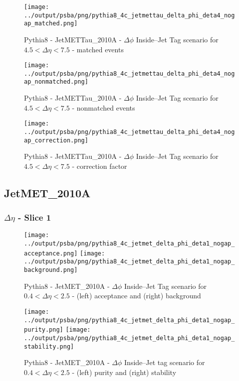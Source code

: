 \documentclass[11pt]{book}
\begin{document}
\begin{figure}[ht]
\centering
\texttt{[image: ../output/psba/png/pythia8\_4c\_jetmettau\_delta\_phi\_deta4\_nogap\_matched.png]}
\caption{Pythia8 - JetMETTau\_2010A - $\Delta\phi$ Inside--Jet Tag scenario for $4.5 < \Delta\eta < 7.5$ - matched events}
\label{fig:p8_jetmettau_delta_phi_deta4_nogap_matched}
\end{figure}

\begin{figure}[ht]
\centering
\texttt{[image: ../output/psba/png/pythia8\_4c\_jetmettau\_delta\_phi\_deta4\_nogap\_nonmatched.png]}
\caption{Pythia8 - JetMETTau\_2010A - $\Delta\phi$ Inside--Jet Tag scenario for $4.5 < \Delta\eta < 7.5$ - nonmatched events}
\label{fig:p8_jetmettau_delta_phi_deta4_nogap_nonmatched}
\end{figure}

\begin{figure}[ht]
\centering
\texttt{[image: ../output/psba/png/pythia8\_4c\_jetmettau\_delta\_phi\_deta4\_nogap\_correction.png]}
\caption{Pythia8 - JetMETTau\_2010A - $\Delta\phi$ Inside--Jet Tag scenario for $4.5 < \Delta\eta < 7.5$ - correction factor}
\label{fig:p8_jetmettau_delta_phi_deta4_nogap_correction}
\end{figure}



\clearpage
\subsection{JetMET\_2010A}

\subsubsection{$\Delta\eta$ - Slice 1}
\begin{figure}[ht]
\centering
\texttt{[image: ../output/psba/png/pythia8\_4c\_jetmet\_delta\_phi\_deta1\_nogap\_acceptance.png]}
\texttt{[image: ../output/psba/png/pythia8\_4c\_jetmet\_delta\_phi\_deta1\_nogap\_background.png]}
\caption{Pythia8 - JetMET\_2010A - $\Delta\phi$ Inside--Jet Tag scenario for $0.4 < \Delta\eta < 2.5$ - (left) acceptance and (right) background}
\label{fig:p8_jetmet_delta_phi_deta1_nogap_ab}
\end{figure}

\begin{figure}[ht]
\centering
\texttt{[image: ../output/psba/png/pythia8\_4c\_jetmet\_delta\_phi\_deta1\_nogap\_purity.png]}
\texttt{[image: ../output/psba/png/pythia8\_4c\_jetmet\_delta\_phi\_deta1\_nogap\_stability.png]}
\caption{Pythia8 - JetMET\_2010A - $\Delta\phi$ Inside--Jet tag scenario for $0.4 < \Delta\eta < 2.5$ - (left) purity and (right) stability}
\label{fig:p8_jetmet_delta_phi_deta1_nogap_ps}
\end{figure}
\end{document}
